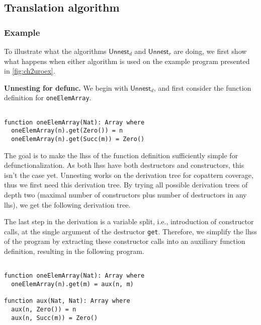\subsection{Translation algorithm}
\label{ssec:unntransl}

\subsubsection{Example}

To illustrate what the algorithms $\textsf{Unnest}_d$ and $\textsf{Unnest}_r$ are doing, we first show what happens when either algorithm is used on the example program presented in \autoref{fig:ch2uroex}.

\textbf{Unnesting for defunc.} We begin with $\textsf{Unnest}_d$, and first consider the function definition for \texttt{oneElemArray}.

\begin{lstlisting}

function oneElemArray(Nat): Array where
  oneElemArray(n).get(Zero()) = n
  oneElemArray(n).get(Succ(m)) = Zero()

\end{lstlisting}

The goal is to make the lhss of the function definition sufficiently simple for defunctionalization. As both lhss have both destructors and constructors, this isn't the case yet. Unnesting works on the derivation tree for copattern coverage, thus we first need this derivation tree. By trying all possible derivation trees of depth two (maximal number of constructors plus number of destructors in any lhs), we get the following derivation tree.

\begin{prooftree}
\end{prooftree}

The last step in the derivation is a variable split, i.e., introduction of constructor calls, at the single argument of the destructor \texttt{get}. Therefore, we simplify the lhss of the program by extracting these constructor calls into an auxiliary function definition, resulting in the following program.

\begin{lstlisting}

function oneElemArray(Nat): Array where
  oneElemArray(n).get(m) = aux(n, m)

function aux(Nat, Nat): Array where
  aux(n, Zero()) = n
  aux(n, Succ(m)) = Zero()

\end{lstlisting}

